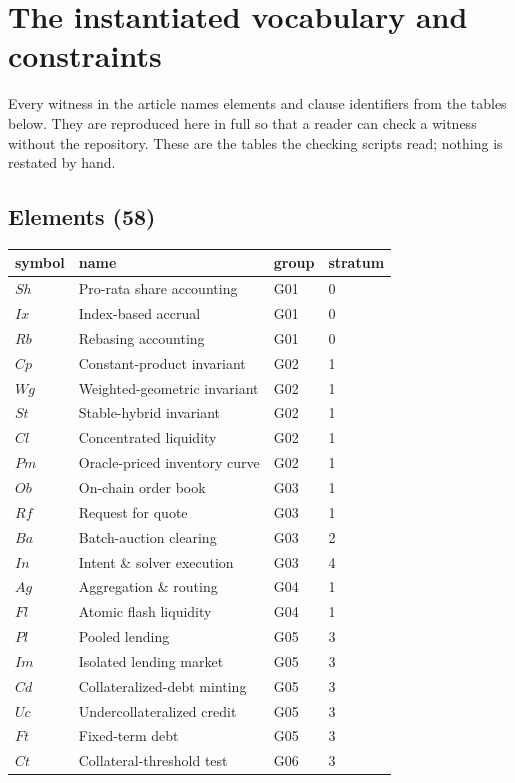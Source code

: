 \section{The instantiated vocabulary and constraints}\label{sec:formaldata}

Every witness in the article names elements and clause identifiers from the
tables below. They are reproduced here in full so that a reader can check a
witness without the repository. These are the tables the checking scripts
read; nothing is restated by hand.

\subsection{Elements (58)}

\begin{longtable}{llll}
\toprule
symbol & name & group & stratum\\
\midrule\endhead
$Sh$ & Pro-rata share accounting & G01 & 0\\
$Ix$ & Index-based accrual & G01 & 0\\
$Rb$ & Rebasing accounting & G01 & 0\\
$Cp$ & Constant-product invariant & G02 & 1\\
$Wg$ & Weighted-geometric invariant & G02 & 1\\
$St$ & Stable-hybrid invariant & G02 & 1\\
$Cl$ & Concentrated liquidity & G02 & 1\\
$Pm$ & Oracle-priced inventory curve & G02 & 1\\
$Ob$ & On-chain order book & G03 & 1\\
$Rf$ & Request for quote & G03 & 1\\
$Ba$ & Batch-auction clearing & G03 & 2\\
$In$ & Intent \& solver execution & G03 & 4\\
$Ag$ & Aggregation \& routing & G04 & 1\\
$Fl$ & Atomic flash liquidity & G04 & 1\\
$Pl$ & Pooled lending & G05 & 3\\
$Im$ & Isolated lending market & G05 & 3\\
$Cd$ & Collateralized-debt minting & G05 & 3\\
$Uc$ & Undercollateralized credit & G05 & 3\\
$Ft$ & Fixed-term debt & G05 & 3\\
$Ct$ & Collateral-threshold test & G06 & 3\\

\end{longtable}
